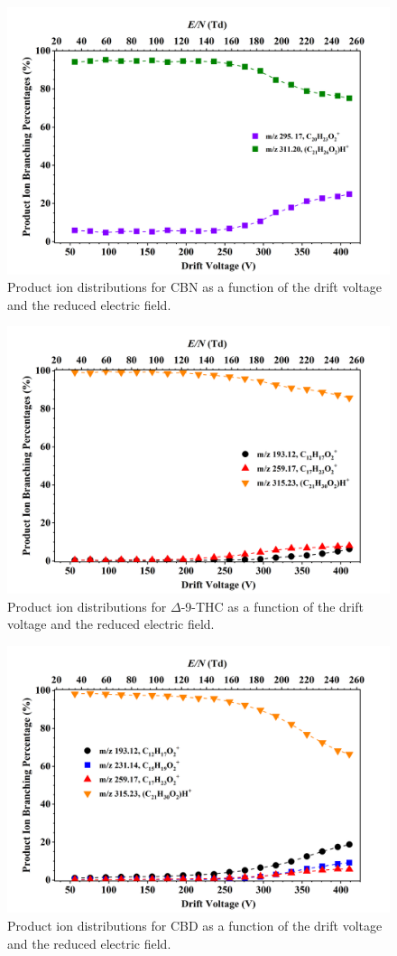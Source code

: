 \begin{figure}[htb]
\centering
\includegraphics[width=0.50\linewidth]{pics/other_drugs/CBN-br.png}
\caption{Product ion distributions for CBN as a function of the drift voltage and the reduced electric field.}
\label{fig:DR_CBN}
\end{figure}

 
\begin{figure}[htb]
\centering
\includegraphics[width=0.50\linewidth]{pics/other_drugs/THC-br.png}
\caption{Product ion distributions for $\Delta$-9-THC as a function of the drift voltage and the reduced electric field.}
\label{fig:DR_THC}
\end{figure}



\begin{figure}[htb]
\centering
\includegraphics[width=0.50\linewidth]{pics/other_drugs/CBD-br.png}
\caption{Product ion distributions for CBD as a function of the drift voltage and the reduced electric field.}
\label{fig:DR_CBD}
\end{figure}



